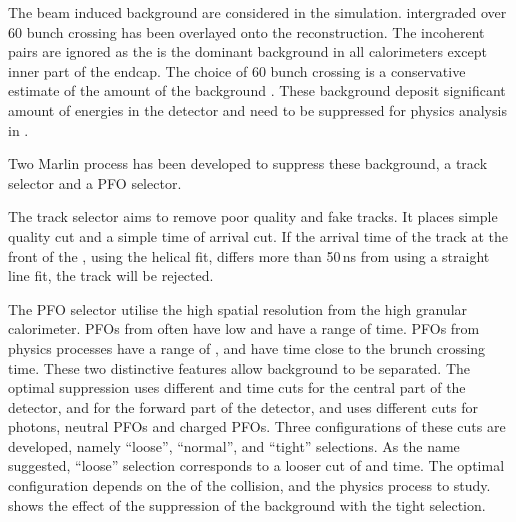 The beam induced background are considered in the simulation. \ggHad intergraded over 60 bunch crossing has been overlayed onto the reconstruction. The incoherent pairs are ignored as the \ggHad is the dominant background in all calorimeters except inner part of the \HCAL endcap. The choice of 60 bunch crossing is a conservative estimate  of  the amount of the background \cite{Barklow:1443518,Barklow:1443518}. These background deposit significant amount of energies in the detector and need to be suppressed for physics analysis in .

Two Marlin process has been developed to suppress these background, a track selector and a PFO selector\cite{Marshall:2012ry}.

The track selector aims to remove poor quality and fake tracks. It places simple quality cut and a simple time of arrival cut. If the arrival time of the track at the front of the \ECAL, using the helical fit, differs more than 50\,ns from using a straight line fit, the track will be rejected.

The PFO selector utilise the high spatial resolution from the high granular calorimeter. PFOs from \ggHad often have low \pT and have a range of time. PFOs from physics processes have a range of \pT, and have time close to the brunch crossing time. These two distinctive features allow \ggHad background to be separated. The optimal suppression uses different \pT and time cuts for the central part of the detector, and for the forward part of the detector, and uses different cuts for photons, neutral PFOs and charged PFOs. Three configurations of these cuts are developed, namely ``loose'', ``normal'', and ``tight'' selections. As the name suggested, ``loose'' selection corresponds to a looser cut of \pT and time. The optimal configuration depends on the \sqrtS of the collision, and the physics process to study.  shows the effect of the suppression of the background with the tight \PFO selection.



